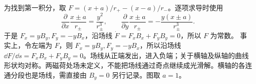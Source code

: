 为找到第一积分，取 $F=(x+a)/r_+-(x-a)/r_-$。逐项求导时使用
\[
\dfrac\partial{\partial x}\dfrac{x\pm a}{r_\pm}
=\dfrac{y^2}{r_\pm^3},\qquad
\dfrac\partial{\partial y}\dfrac{x\pm a}{r_\pm}
=-\dfrac{y(x\pm a)}{r_\pm^3}.
\]
于是 $F_x=yB_y,F_y=-yB_x$，沿场线 $\dot F=F_xB_x+F_yB_y=0$，所以 $F$ 为常数。
事实上，令左端为 $F$，则 $F_x=yB_y,F_y=-yB_x$，所以沿场线 $\dd F/\dd s=F_xB_x+F_yB_y=0$。场线从正端发出，进入负端；关于横轴及纵轴的曲线形状均对称。两磁荷处场未定义，不能把场线通过奇点继续成光滑解。横轴的各连通分段也是场线，需直接由 $B_y=0$ 另行记录。图取 $a=1$。

